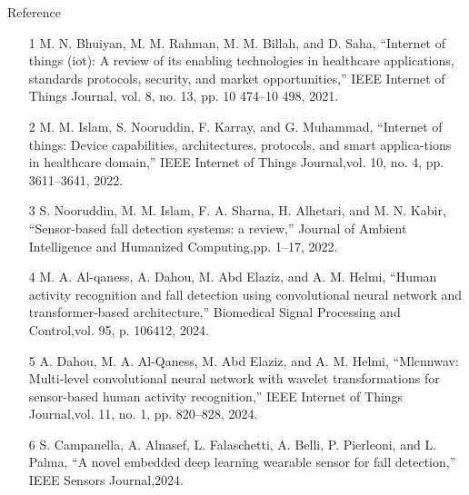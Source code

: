 \documentclass{beamer}
\begin{document}
\begin{frame}{Reference}
\scriptsize
    \begin{itemize}
        \item [1] M. N. Bhuiyan, M. M. Rahman, M. M. Billah, and D. Saha, “Internet of things (iot): A review of its enabling technologies in healthcare applications, standards protocols, security, and market opportunities,” IEEE Internet of Things Journal, vol. 8, no. 13, pp. 10 474–10 498, 2021.    
        \item [2] M. M. Islam, S. Nooruddin, F. Karray, and G. Muhammad, “Internet of things: Device capabilities, architectures, protocols, and smart applica-tions in healthcare domain,” IEEE Internet of Things Journal,vol. 10, no. 4, pp. 3611–3641, 2022.
        \item [3] S. Nooruddin, M. M. Islam, F. A. Sharna, H. Alhetari, and M. N. Kabir, “Sensor-based fall detection systems: a review,” Journal of Ambient Intelligence and Humanized Computing,pp. 1–17, 2022.
        \item [4] M. A. Al-qaness, A. Dahou, M. Abd Elaziz, and A. M. Helmi, “Human activity recognition and fall detection using convolutional neural network and transformer-based architecture,” Biomedical Signal Processing and Control,vol. 95, p. 106412, 2024.
        \item [5] A. Dahou, M. A. Al-Qaness, M. Abd Elaziz, and A. M. Helmi, “Mlcnnwav: Multi-level convolutional neural network with wavelet transformations for sensor-based human activity recognition,” IEEE Internet of Things Journal,vol. 11, no. 1, pp. 820–828, 2024.
        \item [6] S. Campanella, A. Alnasef, L. Falaschetti, A. Belli, P. Pierleoni, and L. Palma, “A novel embedded deep learning wearable sensor for fall detection,” IEEE Sensors Journal,2024.       
    \end{itemize}
\end{frame}
\end{document}
